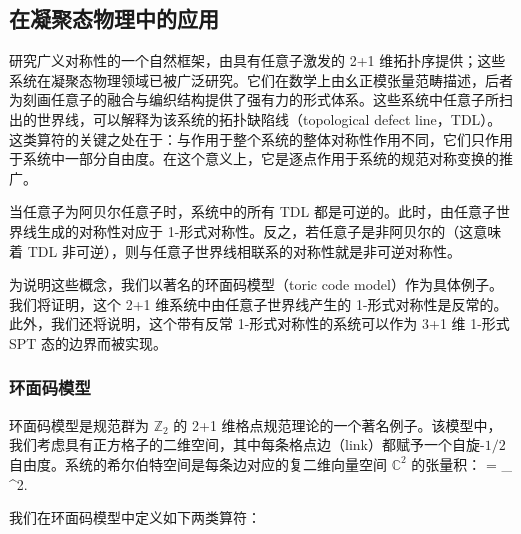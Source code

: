 
\subsection{在凝聚态物理中的应用}\label{sec:appl-CMP}

研究广义对称性的一个自然框架，由具有任意子激发的 2+1 维拓扑序提供；这些系统在凝聚态物理领域已被广泛研究。它们在数学上由幺正模张量范畴描述，后者为刻画任意子的融合与编织结构提供了强有力的形式体系\cite{KITAEV20062}。这些系统中任意子所扫出的世界线，可以解释为该系统的拓扑缺陷线（topological defect line，TDL）。这类算符的关键之处在于：与作用于整个系统的整体对称性作用不同，它们只作用于系统中一部分自由度\cite{PhysRevB.72.045137,pnas.0803726105,NUSSINOV2009977}。在这个意义上，它是逐点作用于系统的规范对称变换的推广。

当任意子为阿贝尔任意子时，系统中的所有 TDL 都是可逆的。此时，由任意子世界线生成的对称性对应于 1-形式对称性。反之，若任意子是非阿贝尔的（这意味着 TDL 非可逆），则与任意子世界线相联系的对称性就是非可逆对称性。

为说明这些概念，我们以著名的环面码模型（toric code model）作为具体例子。我们将证明，这个 2+1 维系统中由任意子世界线产生的 1-形式对称性是反常的。此外，我们还将说明，这个带有反常 1-形式对称性的系统可以作为 3+1 维 1-形式 SPT 态的边界而被实现。

\subsubsection{环面码模型}

环面码模型\cite{KITAEV20032}是规范群为 $\mathbb{Z}_2$ 的 2+1 维格点规范理论的一个著名例子。该模型中，我们考虑具有正方格子的二维空间，其中每条格点边（link）都赋予一个自旋-$1/2$ 自由度。系统的希尔伯特空间是每条边对应的复二维向量空间 $\mathbb{C}^2$ 的张量积：
\be
{} = \bigotimes_{} ^2.
\ee

我们在环面码模型中定义如下两类算符：
\begin{center}
\end{center}

